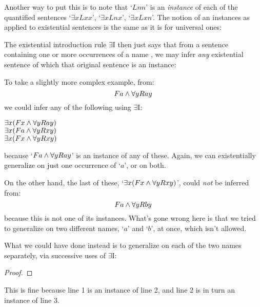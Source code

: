 Another way to put this is to note that `$Lnn$' is an \emph{instance} of each of the quantified sentences `$\exists xLxx$',  `$\exists xLnx$', `$\exists xLxn$'.  The notion of an instances as applied to existential sentences is the same as it is for universal ones:


The existential introduction rule $\exists$I then just says that from a sentence  containing one or more occurrences of a name , we may infer \emph{any} existential sentence of which that original sentence is an instance:


To take a slightly more complex example, from:
$$Fa \wedge \forall yRay$$
we could infer any of the following using $\exists$I:
\begin{center}
$\exists x(Fx \wedge \forall yRay)$\\
$\exists x(Fa \wedge \forall yRxy)$\\
$\exists x(Fx \wedge \forall yRxy)$\\
\end{center}
because `$Fa \wedge \forall yRay$' is an instance of any of these.  Again, we can existentially generalize on just one occurrence of `$a$', or on both.

On the other hand, the last of these, `$\exists x(Fx \wedge \forall yRxy)$', could \emph{not} be inferred from:
$$Fa \wedge \forall yRby$$
because this is not one of its instances.  What's gone wrong here is that we tried to generalize on two different names, `$a$' and `$b$', at once, which isn't allowed.  

What we could have done  instead is to generalize on each of the two names separately, via successive uses of $\exists$I:

\begin{proof}
	 
\end{proof}
This is fine because line 1 is an instance of line 2, and line 2 is in turn an instance of line 3.  

